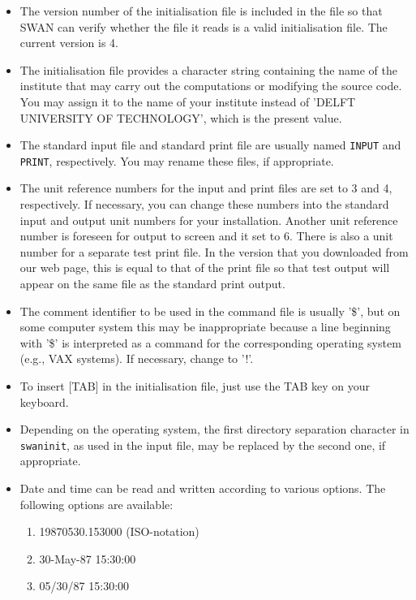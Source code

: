 \documentclass[12pt]{book}
\begin{document}
\begin{itemize}
   \item The version number of the initialisation file is included in the file so that SWAN can
         verify whether the file it reads is a valid initialisation file. The current version is 4.
   \item The initialisation file provides a character string containing the name of the institute
         that may carry out the computations or modifying the source code. You may assign it to
         the name of your institute instead of 'DELFT UNIVERSITY OF TECHNOLOGY', which is the
         present value.
   \item The standard input file and standard print file are usually named {\tt INPUT} and
         {\tt PRINT}, respectively. You may rename these files, if appropriate.
   \item The unit reference numbers for the input and print files are set to 3 and 4, respectively.
         If necessary, you can change these numbers into the standard input and output unit numbers
         for your installation. Another unit reference number is foreseen for output to screen and
         it set to 6. There is also a unit number for a separate test print file. In the
         version that you downloaded from our web page, this is equal to that of the print file so
         that test output will appear on the same file as the standard print output.
   \item The comment identifier to be used in the command file is usually '\$', but on some computer
         system this may be inappropriate because a line beginning with '\$' is interpreted as a
         command for the corresponding operating system (e.g., VAX systems). If necessary, change
         to '!'.
   \item To insert [TAB] in the initialisation file, just use the TAB key on your keyboard.
   \item Depending on the operating system, the first directory separation character in {\tt swaninit},
         as used in the input file, may be replaced by the second one, if appropriate.
   \item Date and time can be read and written according to various options. The following options
         are available:
         \begin{enumerate}
            \item 19870530.153000 (ISO-notation)
            \item 30-May-87 15:30:00
            \item 05/30/87  15:30:00

\end{enumerate}
\end{itemize}
\end{document}
